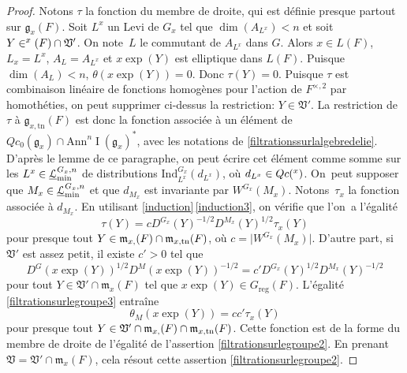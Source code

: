 \documentclass[11pt]{article}
\numberwithin{equation}{section}\providecommand{\og}{«\,}\providecommand{\fg}{\,»}
\let\mathcal \EuScript
\newcommand{\NoChangel}[1]{%
\expandafter\let\csname old\string#1\endcsname=#1
\let#1=\relax
\newcommand{#1}{\mathcode`l="716C\csname old\string#1\endcsname\mathcode`l="7160 }%
}
\newcommand{\frg}{\mathfrak{g}}
\newcommand{\frl}{\mathfrak{l}}\NoChangel{\frl}
\newcommand{\mfrm}{\mathfrak{m}}
\newcommand{\frV}{\mathfrak{V}}
\newcommand{\Ann}{\mathrm{Ann}}
\newcommand{\rell}{\mathrm{ell}} \NoChangel{\rell}
\newcommand{\Ind}{\mathrm{Ind}}
\newcommand{\reg}{\mathrm{reg}}
\newcommand{\tn}{\mathrm{tn}}
\DeclareMathOperator{\rI}{I}
\newcommand{\cL}{\mathcal{L}}
\theoremstyle{plain}
\theoremstyle{definition}
\begin{document}
\begin{proof}
Notons $\tau$ la fonction du membre de droite, qui est définie presque partout sur $\frg_{x}(F)$.
Soit $L^x$ un Levi de $G_{x}$ tel que $\dim(A_{L^x})<n$ et soit $Y\in \frl^x_{\rell}(F)\cap \frV'$. On note~$L$ le commutant de $A_{L^x}$ dans $G$. Alors $x\in L(F)$, $L_{x}=L^x$, $A_{L}=A_{L^x}$ et $x \exp(Y)$ est elliptique dans $L(F)$. Puisque $\dim(A_{L})<n$, $\theta(x \exp(Y))=0$. Donc $\tau(Y)=0$. Puisque $\tau$ est combinaison linéaire de fonctions homogènes pour l'action de $F^{\times,2}$ par homothéties, on peut supprimer ci-dessus la restriction: $Y\in \frV'$. La restriction de $\tau$ à $\frg_{x,\tn}(F)$ est donc la fonction associée à un élément de $Qc_{0}(\frg_{x})\cap \Ann^{n}\rI(\frg_{x})^*$, avec les notations de \ref{filtrationssurlalgebredelie}. D'après le lemme de ce paragraphe, on peut écrire cet élément comme somme sur les $L^x\in \underline{\cL}_{\min}^{G_{x},n}$ de distributions $\Ind_{L^x}^{G_{x}}(d_{L^x})$, où $d_{L^x}\in Qc(\frl^x)$. On~peut supposer que $M_{x}\in \underline{\cL}_{\min}^{G_{x},n}$ et que $d_{M_{x}}$ est invariante par $ W^{G_{x}}(M_{x})$. Notons~$\tau_{x}$ la fonction associée à $d_{M_{x}}$. En utilisant \ref{induction}\,\eqref{induction3}, on vérifie que l'on~a l'égalité
\[
\tau(Y)=cD^{G_{x}}(Y)^{-1/2}D^{M_{x}}(Y)^{1/2}\tau_{x}(Y)
\]
pour presque tout $Y\in
\mfrm_{x,\rell}(F)\cap \mfrm_{x,\tn}(F)$, où $c=\vert W^{G_{x}}(M_{x})\vert $. D'autre part, si $\frV'$ est assez petit, il existe $c'>0$ tel que
\[
D^G(x \exp(Y))^{1/2}D^M(x \exp(Y))^{-1/2}=c'D^{G_{x}}(Y)^{1/2}D^{M_{x}}(Y)^{-1/2}
\]
pour tout $Y\in \frV'\cap \mfrm_{x}(F)$ tel que $x \exp(Y)\in G_{\reg}(F)$. L'égalité \eqref{filtrationsurlegroupe3} entraîne
\[
\theta_{M}(x \exp(Y))=cc'\tau_{x}(Y)
\]
pour presque tout $Y\in
\frV'\cap\mfrm_{x,\rell}(F)\cap \mfrm_{x,\tn}(F)$.
Cette fonction est de la forme du membre de droite de l'égalité de l'assertion \eqref{filtrationsurlegroupe2}. En prenant $\frV=\frV'\cap \mfrm_{x}(F)$, cela résout cette assertion \eqref{filtrationsurlegroupe2}.


\end{proof}
\end{document}
